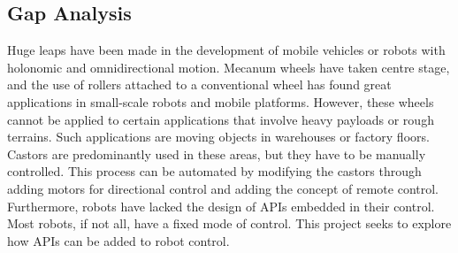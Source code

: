 \subsection{Gap Analysis}
Huge leaps have been made in the development of mobile vehicles or robots with holonomic and omnidirectional motion. Mecanum wheels have taken centre stage, and the use of rollers attached to a conventional wheel has found great applications in small-scale robots and mobile platforms. However, these wheels cannot be applied to certain applications that involve heavy payloads or rough terrains. Such applications are moving objects in warehouses or factory floors. Castors are predominantly used in these areas, but they have to be manually controlled. This process can be automated by modifying the castors through adding motors for directional control and adding the concept of remote control. Furthermore, robots have lacked the design of \ac{API}s embedded in their control. Most robots, if not all, have a fixed mode of control. This project seeks to explore how \ac{API}s can be added to robot control.

















